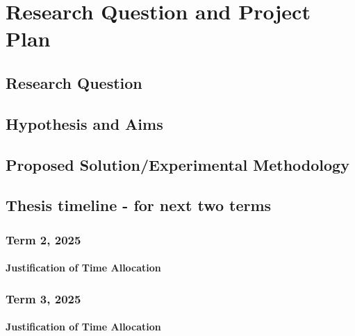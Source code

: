 \section{Research Question and Project Plan}


\subsection{Research Question}

\subsection{Hypothesis and Aims}

\subsection{Proposed Solution/Experimental Methodology}

\subsection{Thesis timeline - for next two terms}
\subsubsection{Term 2, 2025}
\paragraph{Justification of Time Allocation}
\subsubsection{Term 3, 2025}
\paragraph{Justification of Time Allocation}

